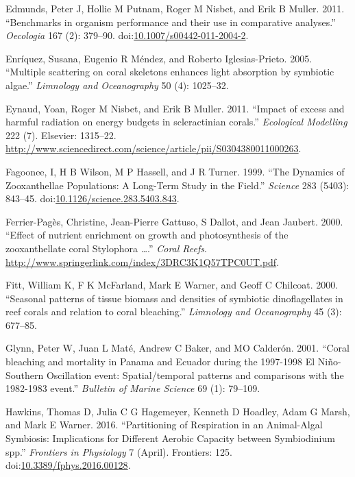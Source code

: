 \documentclass[]{elsarticle} %
\begin{document}
\hypertarget{ref-Edmunds:2011bv}{}
Edmunds, Peter J, Hollie M Putnam, Roger M Nisbet, and Erik B Muller.
2011. ``Benchmarks in organism performance and their use in comparative
analyses.'' \emph{Oecologia} 167 (2): 379--90.
doi:\href{https://doi.org/10.1007/s00442-011-2004-2}{10.1007/s00442-011-2004-2}.

\hypertarget{ref-Enriquez:2005p142}{}
Enríquez, Susana, Eugenio R Méndez, and Roberto Iglesias-Prieto. 2005.
``Multiple scattering on coral skeletons enhances light absorption by
symbiotic algae.'' \emph{Limnology and Oceanography} 50 (4): 1025--32.

\hypertarget{ref-Eynaud:2011tv}{}
Eynaud, Yoan, Roger M Nisbet, and Erik B Muller. 2011. ``Impact of
excess and harmful radiation on energy budgets in scleractinian
corals.'' \emph{Ecological Modelling} 222 (7). Elsevier: 1315--22.
\url{http://www.sciencedirect.com/science/article/pii/S0304380011000263}.

\hypertarget{ref-Fagoonee:1999p4136}{}
Fagoonee, I, H B Wilson, M P Hassell, and J R Turner. 1999. ``The
Dynamics of Zooxanthellae Populations: A Long-Term Study in the Field.''
\emph{Science} 283 (5403): 843--45.
doi:\href{https://doi.org/10.1126/science.283.5403.843}{10.1126/science.283.5403.843}.

\hypertarget{ref-FerrierPages:2000p1950}{}
Ferrier-Pagès, Christine, Jean-Pierre Gattuso, S Dallot, and Jean
Jaubert. 2000. ``Effect of nutrient enrichment on growth and
photosynthesis of the zooxanthellate coral Stylophora \ldots{}.''
\emph{Coral Reefs}.
\url{http://www.springerlink.com/index/3DRC3K1Q57TPC0UT.pdf}.

\hypertarget{ref-Fitt:2000p3792}{}
Fitt, William K, F K McFarland, Mark E Warner, and Geoff C Chilcoat.
2000. ``Seasonal patterns of tissue biomass and densities of symbiotic
dinoflagellates in reef corals and relation to coral bleaching.''
\emph{Limnology and Oceanography} 45 (3): 677--85.

\hypertarget{ref-Glynn:2001p7571}{}
Glynn, Peter W, Juan L Maté, Andrew C Baker, and MO Calderón. 2001.
``Coral bleaching and mortality in Panama and Ecuador during the
1997-1998 El Niño-Southern Oscillation event: Spatial/temporal patterns
and comparisons with the 1982-1983 event.'' \emph{Bulletin of Marine
Science} 69 (1): 79--109.

\hypertarget{ref-Hawkins:2016jj}{}
Hawkins, Thomas D, Julia C G Hagemeyer, Kenneth D Hoadley, Adam G Marsh,
and Mark E Warner. 2016. ``Partitioning of Respiration in an
Animal-Algal Symbiosis: Implications for Different Aerobic Capacity
between Symbiodinium spp.'' \emph{Frontiers in Physiology} 7 (April).
Frontiers: 125.
doi:\href{https://doi.org/10.3389/fphys.2016.00128}{10.3389/fphys.2016.00128}.
\end{document}
